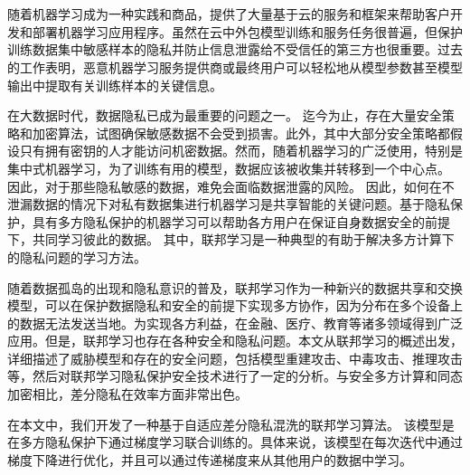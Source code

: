 \vspace{-2.5cm}
\chapter*{}

随着机器学习成为一种实践和商品，提供了大量基于云的服务和框架来帮助客户开发和部署机器学习应用程序。虽然在云中外包模型训练和服务任务很普遍，但保护训练数据集中敏感样本的隐私并防止信息泄露给不受信任的第三方也很重要。过去的工作表明，恶意机器学习服务提供商或最终用户可以轻松地从模型参数甚至模型输出中提取有关训练样本的关键信息。

在大数据时代，数据隐私已成为最重要的问题之一。 迄今为止，存在大量安全策略和加密算法，试图确保敏感数据不会受到损害。此外，其中大部分安全策略都假设只有拥有密钥的人才能访问机密数据。然而，随着机器学习的广泛使用，特别是集中式机器学习，为了训练有用的模型，数据应该被收集并转移到一个中心点。 因此，对于那些隐私敏感的数据，难免会面临数据泄露的风险。 因此，如何在不泄漏数据的情况下对私有数据集进行机器学习是共享智能的关键问题。基于隐私保护，具有多方隐私保护的机器学习可以帮助各方用户在保证自身数据安全的前提下，共同学习彼此的数据。 其中，联邦学习是一种典型的有助于解决多方计算下的隐私问题的学习方法。

随着数据孤岛的出现和隐私意识的普及，联邦学习作为一种新兴的数据共享和交换模型，可以在保护数据隐私和安全的前提下实现多方协作，因为分布在多个设备上的数据无法发送当地。为实现各方利益，在金融、医疗、教育等诸多领域得到广泛应用。但是，联邦学习也存在各种安全和隐私问题。本文从联邦学习的概述出发，详细描述了威胁模型和存在的安全问题，包括模型重建攻击、中毒攻击、推理攻击等，然后对联邦学习隐私保护安全技术进行了一定的分析。与安全多方计算和同态加密相比，差分隐私在效率方面非常出色。 

在本文中，我们开发了一种基于自适应差分隐私混洗的联邦学习算法。 该模型是在多方隐私保护下通过梯度学习联合训练的。具体来说，该模型在每次迭代中通过梯度下降进行优化，并且可以通过传递梯度来从其他用户的数据中学习。

